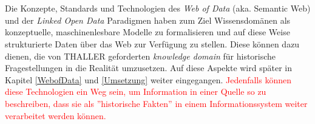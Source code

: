 \documentclass[12pt,a4paper]{article}
\begin{document}
\\
\\
Die Konzepte, Standards und Technologien des \textit{Web of Data} (aka. Semantic Web) und der \textit{Linked Open Data} Paradigmen haben zum Ziel Wissensdomänen als konzeptuelle, maschinenlesbare Modelle zu formalisieren und auf diese Weise strukturierte Daten über das Web zur Verfügung zu stellen. Diese können dazu dienen, die von THALLER geforderten \textit{knowledge domain} für historische Fragestellungen in die Realität umzusetzen. Auf diese Aspekte wird später in Kapitel \ref{WebofData} und \ref{Umsetzung} weiter eingegangen.
\textcolor{red}
{Jedenfalls können diese Technologien ein Weg sein, um Information in einer Quelle so zu beschreiben, dass sie als ''historische Fakten'' in einem Informationssystem weiter verarbeitet werden können.
}

\end{document}
